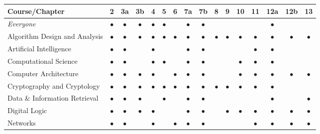 \bigskip


\noindent
\begin{tabular}{|l||c|c|c|c|c|c|c|c|c|c|c|c|c|c|c|}
\hline
{\bf Course}/{\bf Chapter}
   & 2 & 3a & 3b & 4 & 5 & 6 & 7a & 7b & 8 & 9 & 10 & 11 & 12a & 12b & 13 \\
\hline
\hline
{\em Everyone} 
   & $\bullet$ & $\bullet$ & $\bullet$ & $\bullet$ & $\bullet$ &  & $\bullet$ & $\bullet$ &  &  &  &  & $\bullet$ & &  \\
\hline
Algorithm Design and Analysis
   & $\bullet$ & $\bullet$ & $\bullet$ & $\bullet$ & $\bullet$ & $\bullet$ & $\bullet$ & $\bullet$ & $\bullet$ & $\bullet$ & $\bullet$ & $\bullet$ & $\bullet$ & $\bullet$ & $\bullet$ \\
   \hline
Artificial Intelligence
   & $\bullet$ & $\bullet$ & & $\bullet$ &  &  & $\bullet$ & $\bullet$ &  &  &  & $\bullet$ & $\bullet$ & &  \\
   \hline
Computational Science
   & $\bullet$ & $\bullet$ & & $\bullet$ & $\bullet$ &  & $\bullet$ & $\bullet$ &  &  & $\bullet$ & $\bullet$ & $\bullet$ &  &  \\
\hline
Computer Architecture 
   & $\bullet$ & $\bullet$ & $\bullet$ & $\bullet$ &  & $\bullet$ & $\bullet$ & $\bullet$ &  &  & $\bullet$ & $\bullet$ & $\bullet$ & $\bullet$ & $\bullet$ \\
\hline
Cryptography and Cryptology 
   & $\bullet$ & $\bullet$ & $\bullet$ & $\bullet$ & $\bullet$ & $\bullet$ & $\bullet$ & $\bullet$ & $\bullet$ & $\bullet$ & $\bullet$ & $\bullet$ & $\bullet$ & &  \\
\hline
Data \& Information Retrieval
   & $\bullet$ & $\bullet$ & $\bullet$ & & $\bullet$ &  & $\bullet$ & $\bullet$ &  &  &  &  & $\bullet$ & & $\bullet$ \\
\hline
Digital Logic 
   & $\bullet$ & $\bullet$ & $\bullet$ & $\bullet$ &  &  & $\bullet$ & $\bullet$ &  & $\bullet$ & $\bullet$ & $\bullet$ & $\bullet$ & $\bullet$ & $\bullet$ \\
\hline
Networks
   & $\bullet$ & $\bullet$ & & $\bullet$ &  & $\bullet$ & $\bullet$ & $\bullet$ &  &  &  & $\bullet$ & $\bullet$ & $\bullet$ & $\bullet$ \\

\end{tabular}
